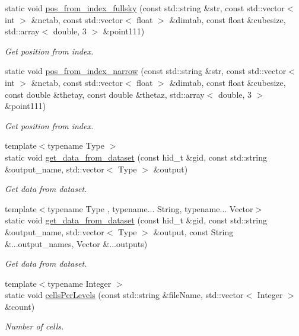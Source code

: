 \begin{DoxyCompactItemize}
static void \hyperlink{classTReadHDF5_a86a0072eed333fd2b67e184fdf00aab4}{pos\-\_\-from\-\_\-index\-\_\-fullsky} (const std\-::string \&str, const std\-::vector$<$ int $>$ \&nctab, const std\-::vector$<$ float $>$ \&dimtab, const float \&cubesize, std\-::array$<$ double, 3 $>$ \&point111)
\begin{DoxyCompactList}\small\item\em Get position from index. \end{DoxyCompactList}\item 
static void \hyperlink{classTReadHDF5_aefb9c43fabfe2ee6f47953bd983a5390}{pos\-\_\-from\-\_\-index\-\_\-narrow} (const std\-::string \&str, const std\-::vector$<$ int $>$ \&nctab, const std\-::vector$<$ float $>$ \&dimtab, const float \&cubesize, const double \&thetay, const double \&thetaz, std\-::array$<$ double, 3 $>$ \&point111)
\begin{DoxyCompactList}\small\item\em Get position from index. \end{DoxyCompactList}\item 
{\footnotesize template$<$typename Type $>$ }\\static void \hyperlink{classTReadHDF5_ab917bdf220564910fc1486f8087a9921}{get\-\_\-data\-\_\-from\-\_\-dataset} (const hid\-\_\-t \&gid, const std\-::string \&output\-\_\-name, std\-::vector$<$ Type $>$ \&output)
\begin{DoxyCompactList}\small\item\em Get data from dataset. \end{DoxyCompactList}\item 
{\footnotesize template$<$typename Type , typename... String, typename... Vector$>$ }\\static void \hyperlink{classTReadHDF5_a6849140b79d37a2f30ebd0313b46d44d}{get\-\_\-data\-\_\-from\-\_\-dataset} (const hid\-\_\-t \&gid, const std\-::string \&output\-\_\-name, std\-::vector$<$ Type $>$ \&output, const String \&...output\-\_\-names, Vector \&...outputs)
\begin{DoxyCompactList}\small\item\em Get data from dataset. \end{DoxyCompactList}\item 
{\footnotesize template$<$typename Integer $>$ }\\static void \hyperlink{classTReadHDF5_a9216682231626d38ad3ae76e3d781b7d}{cells\-Per\-Levels} (const std\-::string \&file\-Name, std\-::vector$<$ Integer $>$ \&count)
\begin{DoxyCompactList}\small\item\em Number of cells. \end{DoxyCompactList}\item 

\end{DoxyCompactItemize}
